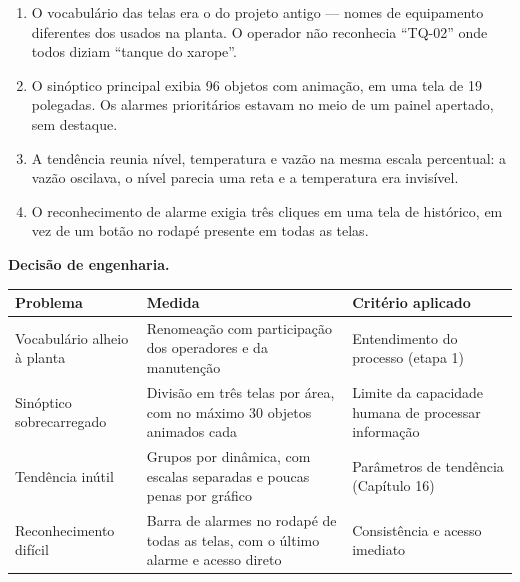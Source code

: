 \begin{enumerate}
\def\labelenumi{\arabic{enumi}.}
\tightlist
\item
  O vocabulário das telas era o do projeto antigo --- nomes de equipamento diferentes dos usados na
  planta. O operador não reconhecia ``TQ-02'' onde todos diziam ``tanque do xarope''.
\item
  O sinóptico principal exibia 96 objetos com animação, em uma tela de 19 polegadas. Os alarmes
  prioritários estavam no meio de um painel apertado, sem destaque.
\item
  A tendência reunia nível, temperatura e vazão na mesma escala percentual: a vazão oscilava, o
  nível parecia uma reta e a temperatura era invisível.
\item
  O reconhecimento de alarme exigia três cliques em uma tela de histórico, em vez de um botão no
  rodapé presente em todas as telas.
\end{enumerate}

\textbf{Decisão de engenharia.}

\begin{longtable}[]{@{}
  >{\raggedright\arraybackslash}p{}
  >{\raggedright\arraybackslash}p{}
  >{\raggedright\arraybackslash}p{}@{}}
\toprule\noalign{}
\begin{minipage}[b]{\linewidth}\raggedright
Problema
\end{minipage} & \begin{minipage}[b]{\linewidth}\raggedright
Medida
\end{minipage} & \begin{minipage}[b]{\linewidth}\raggedright
Critério aplicado
\end{minipage} \\
\midrule\noalign{}
\endhead
\bottomrule\noalign{}
\endlastfoot
Vocabulário alheio à planta & Renomeação com participação dos operadores e da manutenção & Entendimento do processo (etapa 1) \\
Sinóptico sobrecarregado & Divisão em três telas por área, com no máximo 30 objetos animados cada & Limite da capacidade humana de processar informação \\
Tendência inútil & Grupos por dinâmica, com escalas separadas e poucas penas por gráfico & Parâmetros de tendência (Capítulo 16) \\
Reconhecimento difícil & Barra de alarmes no rodapé de todas as telas, com o último alarme e acesso direto & Consistência e acesso imediato \\
\end{longtable}

